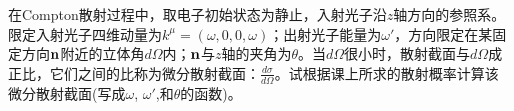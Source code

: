 \documentclass[CJK]{beamer}
\begin{document}
\begin{frame}
\bch
在Compton散射过程中，取电子初始状态为静止，入射光子沿$z$轴方向的参照系。限定入射光子四维动量为$k^\mu=(\omega, 0, 0, \omega)$；出射光子能量为$\omega'$，方向限定在某固定方向${\mathbf{n}}$附近的立体角$d\Omega$内；${\mathbf{n}}$与$z$轴的夹角为$\theta$。当$d\Omega$很小时，散射截面与$d\Omega$成正比，它们之间的比称为微分散射截面：$\frac{d\sigma}{d\Omega}$。试根据课上所求的散射概率计算该微分散射截面(写成$\omega$, $\omega'$,和$\theta$的函数)。
\ech
\end{frame}
\end{document}
